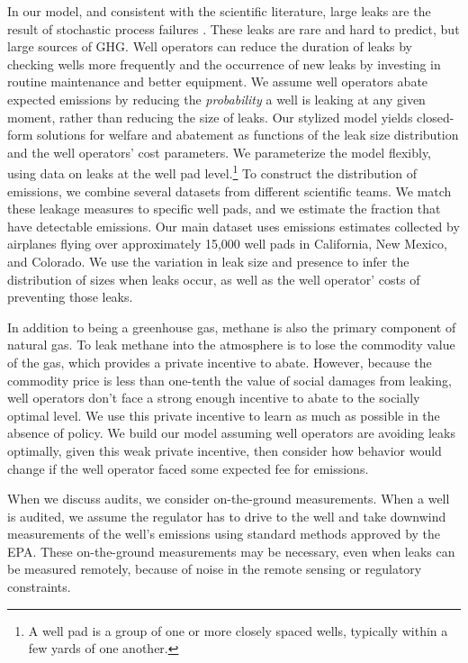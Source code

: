 \documentclass[12pt,oneside,letterpaper]{article}
\theoremstyle{definition}
\begin{document}
\begin{refsection}
In our model, and consistent with the scientific literature, large leaks are the result of stochastic process failures
\parencite{Lyon/Alvarez/Zavala-Araiza/Brandt/Jackson/Hamburg:2016, ZavalaAraiza/etal:2017}.
These leaks are rare and hard to predict, but large sources of \gls{GHG}.
Well operators can reduce the duration of leaks by checking wells more frequently and the occurrence of new leaks by investing in routine maintenance and better equipment.
We assume well operators abate expected emissions by reducing the \emph{probability} a well is leaking at any given moment, rather than reducing the size of leaks.
Our stylized model yields closed-form solutions for welfare and abatement as functions of the leak size distribution and the well operators' cost parameters.
We parameterize the model flexibly, using data on leaks at the well pad level.\footnote{%
A well pad is a group of one or more closely spaced wells, typically within a few yards of one another.
}
To construct the distribution of emissions, we combine several datasets from different scientific teams.
We match these leakage measures to specific well pads, and we estimate the fraction that have detectable emissions.
Our main dataset uses emissions estimates collected by airplanes flying over approximately 15,000 well pads in California, New Mexico, and Colorado.
We use the variation in leak size and presence to infer the distribution of sizes when leaks occur, as well as the well operator' costs of preventing those leaks.


In addition to being a greenhouse gas, methane is also the primary component of natural gas.
To leak methane into the atmosphere is to lose the commodity value of the gas,
which provides a private incentive to abate.
However, because the commodity price is less than one-tenth the value of social damages from leaking, well operators don't face a strong enough incentive to abate to the socially optimal level.
We use this private incentive to learn as much as possible in the absence of policy.
We build our model assuming well operators are avoiding leaks optimally, given this weak private incentive, then consider how behavior would change if the well operator faced some expected fee for emissions.

When we discuss audits, we consider on-the-ground measurements.
When a well is audited, we assume the regulator has to drive to the well and take downwind measurements of the well's emissions using standard methods approved by the \gls{EPA}.
These on-the-ground measurements may be necessary, even when leaks can be measured remotely, because of noise in the remote sensing or regulatory constraints.



\end{refsection}
\end{document}
